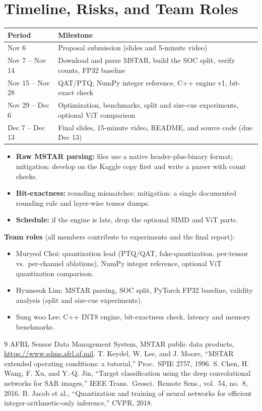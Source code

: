 \documentclass[10pt,letterpaper]{article}
\begin{document}
\section{Timeline, Risks, and Team Roles}
\begin{center}
\small
\begin{tabularx}{\linewidth}{@{}l X@{}}
\toprule
Period & Milestone \\
\midrule
Nov 6 & Proposal submission (slides and 5-minute video) \\
Nov 7 -- Nov 14 & Download and parse MSTAR, build the SOC split, verify counts, FP32 baseline \\
Nov 15 -- Nov 28 & QAT/PTQ, NumPy integer reference, C++ engine v1, bit-exact check \\
Nov 29 -- Dec 6 & Optimization, benchmarks, split and size-cue experiments, optional ViT comparison \\
Dec 7 -- Dec 13 & Final slides, 15-minute video, README, and source code (due Dec 13) \\
\bottomrule
\end{tabularx}
\end{center}
\begin{itemize}
\item \textbf{Raw MSTAR parsing:} files use a native header-plus-binary format; mitigation: develop on the Kaggle copy first and write a parser with count checks.
\item \textbf{Bit-exactness:} rounding mismatches; mitigation: a single documented rounding rule and layer-wise tensor dumps.
\item \textbf{Schedule:} if the engine is late, drop the optional SIMD and ViT parts.
\end{itemize}
\textbf{Team roles} (all members contribute to experiments and the final report):
\begin{itemize}
\item Muryeol Choi: quantization lead (PTQ/QAT, fake-quantization, per-tensor vs.\ per-channel ablations), NumPy integer reference, optional ViT quantization comparison.
\item Hyunseok Lim: MSTAR parsing, SOC split, PyTorch FP32 baseline, validity analysis (split and size-cue experiments).
\item Sung woo Lee: C++ INT8 engine, bit-exactness check, latency and memory benchmarks.
\end{itemize}

\begin{thebibliography}{9}\small
{} AFRL Sensor Data Management System, MSTAR public data products, \url{https://www.sdms.afrl.af.mil}.
 T. Keydel, W. Lee, and J. Moore, ``MSTAR extended operating conditions: a tutorial,'' Proc.\ SPIE 2757, 1996.
 S. Chen, H. Wang, F. Xu, and Y.-Q. Jin, ``Target classification using the deep convolutional networks for SAR images,'' IEEE Trans.\ Geosci.\ Remote Sens., vol.\ 54, no.\ 8, 2016.
 B. Jacob et al., ``Quantization and training of neural networks for efficient integer-arithmetic-only inference,'' CVPR, 2018.
\end{thebibliography}
\end{document}
